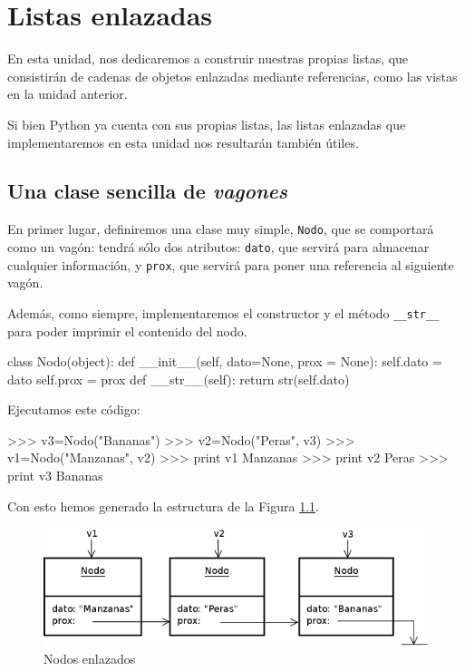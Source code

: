 \chapter{Listas enlazadas}

En esta unidad, nos dedicaremos a construir nuestras propias listas, que
consistirán de cadenas de objetos enlazadas mediante referencias, como las
vistas en la unidad anterior.

Si bien Python ya cuenta con sus propias listas, las listas enlazadas que
implementaremos en esta unidad nos resultarán también útiles.

\section{Una clase sencilla de {\it vagones}}

En primer lugar, definiremos una clase muy simple, \lstinline!Nodo!, que se
comportará como un vagón: tendrá sólo dos atributos: \lstinline!dato!, que
servirá para almacenar cualquier información, y \lstinline!prox!, que servirá
para poner una referencia al siguiente vagón.

Además, como siempre, implementaremos el constructor y el método
\lstinline!__str__! para poder imprimir el contenido del nodo.

\begin{codigo-python-sn}
class Nodo(object):
    def __init__(self, dato=None, prox = None):
        self.dato = dato
        self.prox = prox
    def __str__(self):
        return str(self.dato)
\end{codigo-python-sn}

Ejecutamos este código:

\begin{codigo-python-sn}
>>> v3=Nodo("Bananas")
>>> v2=Nodo("Peras", v3)
>>> v1=Nodo("Manzanas", v2)
>>> print v1
Manzanas
>>> print v2
Peras
>>> print v3
Bananas
\end{codigo-python-sn}

Con esto hemos generado la estructura de la Figura \ref{nodos}.

\begin{figure}[htb]
\label{nodos}
\includegraphics{graficos/16_Nodos}
\caption{Nodos enlazados}
\end{figure}

